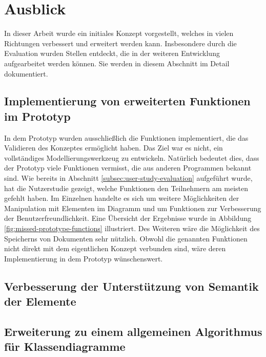 \section{Ausblick}
\label{sec:outlook}

In dieser Arbeit wurde ein initiales Konzept vorgestellt, welches in vielen Richtungen verbessert und erweitert werden kann. Insbesondere durch die Evaluation wurden Stellen entdeckt, die in der weiteren Entwicklung aufgearbeitet werden können. Sie werden in diesem Abschnitt im Detail dokumentiert.

\subsection{Implementierung von erweiterten Funktionen im Prototyp}

In dem Prototyp wurden ausschließlich die Funktionen implementiert, die das Validieren des Konzeptes ermöglicht haben. Das Ziel war es nicht, ein vollständiges Modellierungswerkzeug zu entwickeln. Natürlich bedeutet dies, dass der Prototyp viele Funktionen vermisst, die aus anderen Programmen bekannt sind. Wie bereits in Abschnitt \ref{subsec:user-study-evaluation} aufgeführt wurde, hat die Nutzerstudie gezeigt, welche Funktionen den Teilnehmern am meisten gefehlt haben. Im Einzelnen handelte es sich um weitere Möglichkeiten der Manipulation mit Elementen im Diagramm und um Funktionen zur Verbesserung der Benutzerfreundlichkeit. Eine Übersicht der Ergebnisse wurde in Abbildung \ref{fig:missed-prototype-functions} illustriert. Des Weiteren wäre die Möglichkeit des Speicherns von Dokumenten sehr nützlich. Obwohl die genannten Funktionen nicht direkt mit dem eigentlichen Konzept verbunden sind, wäre deren Implementierung in dem Prototyp wünschenswert.

\subsection{Verbesserung der Unterstützung von Semantik der Elemente}




\subsection{Erweiterung zu einem allgemeinen Algorithmus für Klassendiagramme}


